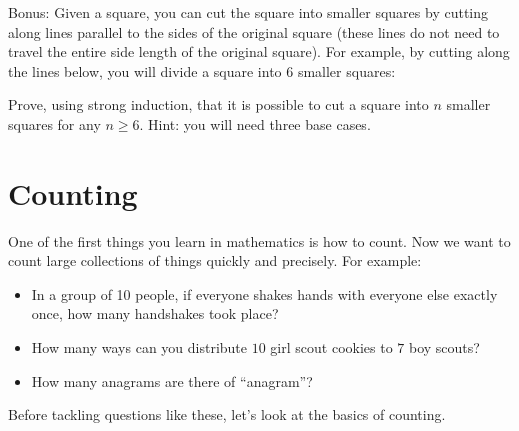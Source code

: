\documentclass[11pt,]{book}
\theoremstyle{ptxplainnotitle}
\theoremstyle{ptxplaintitle}
\theoremstyle{ptxdefinitionnotitle}
\theoremstyle{ptxdefinitiontitle}
\theoremstyle{ptxdefinitionnotitle}
\theoremstyle{ptxdefinitiontitle}
\theoremstyle{ptxdefinitionnotitle}
\theoremstyle{ptxdefinitiontitle}
\theoremstyle{ptxdefinitiontitlenonumber}
\theoremstyle{ptxdefinitiontitlenonumber}
\numberwithin{equation}{chapter}
\begin{document}
\begin{divisionexercise}{24}\hypertarget{exercise-77}{}
\hypertarget{p-695}{}%
Bonus: Given a square, you can cut the square into smaller squares by cutting along lines parallel to the sides of the original square (these lines do not need to travel the entire side length of the original square).  For example, by cutting along the lines below, you will divide a square into 6 smaller squares:%
\begin{sidebyside}{1}{0.325}{0.325}{0}
\begin{sbspanel}{0.35}
\end{sbspanel}
\end{sidebyside}
\par
\hypertarget{p-696}{}%
Prove, using strong induction, that it is possible to cut a square into \(n\) smaller squares for any \(n \ge 6\).  Hint: you will need three base cases.%
\end{divisionexercise}%
\typeout{************************************************}
\typeout{************************************************}
\chapter[{Counting}]{Counting}\label{ch_counting}
\hypertarget{p-701}{}%
One of the first things you learn in mathematics is how to count. Now we want to count large collections of things quickly and precisely. For example: \leavevmode%
\begin{itemize}[label=\textbullet]
\item{}\hypertarget{p-702}{}%
In a group of 10 people, if everyone shakes hands with everyone else exactly once, how many handshakes took place?%
\item{}\hypertarget{p-703}{}%
How many ways can you distribute \(10\) girl scout cookies to \(7\) boy scouts?%
\item{}\hypertarget{p-704}{}%
How many anagrams are there of ``anagram''?%
\end{itemize}
%
\par
\hypertarget{p-705}{}%
Before tackling questions like these, let's look at the basics of counting.%
\typeout{************************************************}
\typeout{************************************************}
\end{document}
